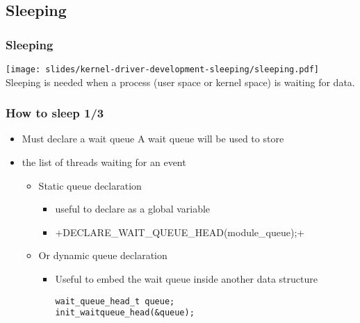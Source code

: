 \subsection{Sleeping}

\begin{frame}
  \frametitle{Sleeping}
  \begin{center}
    \texttt{[image: slides/kernel-driver-development-sleeping/sleeping.pdf]}\\
    Sleeping is needed when a process (user space or kernel space) is
    waiting for data.
  \end{center}
\end{frame}

\begin{frame}[fragile]
  \frametitle{How to sleep 1/3}
  \begin{itemize}
  \item Must declare a wait queue A wait queue will be used to store
  \item the list of threads waiting for an event
    \begin{itemize}
    \item Static queue declaration
      \begin{itemize}
      \item useful to declare as a global variable
      \item {}+DECLARE_WAIT_QUEUE_HEAD(module_queue);+
      \end{itemize}
    \item Or dynamic queue declaration
      \begin{itemize}
      \item Useful to embed the wait queue inside another data
        structure
\begin{verbatim}
wait_queue_head_t queue;
init_waitqueue_head(&queue);
\end{verbatim}
      \end{itemize}
    \end{itemize}
  \end{itemize}
\end{frame}

